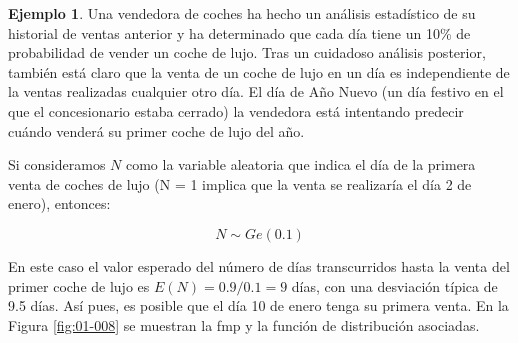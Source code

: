 \documentclass[
]{book}
\theoremstyle{definition}
\theoremstyle{definition}
\newtheorem{example}{Ejemplo}[chapter]
\theoremstyle{definition}
\theoremstyle{definition}
\theoremstyle{remark}
\begin{document}
\begin{example}
\protect\hypertarget{exm:geom01}{}\label{exm:geom01}Una vendedora de coches ha hecho un análisis estadístico de su historial de ventas anterior y ha determinado que cada día tiene un 10\% de probabilidad de vender un coche de lujo. Tras un cuidadoso análisis posterior, también está claro que la venta de un coche de lujo en un día es independiente de la ventas realizadas cualquier otro día. El día de Año Nuevo (un día festivo en el que el concesionario estaba cerrado) la vendedora está intentando predecir cuándo venderá su primer coche de lujo del año.
\end{example}

Si consideramos \(N\) como la variable aleatoria que indica el día de la primera venta de coches de lujo (N = 1 implica que la venta se realizaría el día 2 de enero), entonces:

\[N \sim Ge(0.1)\]

En este caso el valor esperado del número de días transcurridos hasta la venta del primer coche de lujo es \(E(N) = 0.9/0.1 = 9\) días, con una desviación típica de 9.5 días. Así pues, es posible que el día 10 de enero tenga su primera venta. En la Figura \ref{fig:01-008} se muestran la fmp y la función de distribución asociadas.
\end{document}
